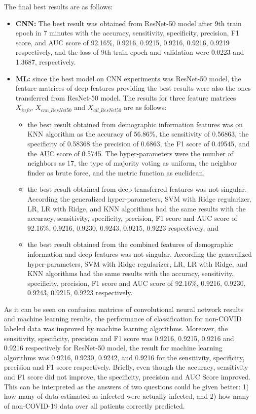 The final best results are as follows:
\begin{itemize}
	\item \textbf{CNN:} The best result was obtained from ResNet-50 model after 9th train epoch in 7 minutes with the accuracy, sensitivity, specificity, precision, F1 score, and AUC score of 92.16\%, 0.9216, 0.9215, 0.9216, 0.9216, 0.9219 respectively, and the loss of 9th train epoch and validation were 0.0223 and 1.3687, respectively.
	\item \textbf{ML:} since the best model on CNN experiments was ResNet-50 model, the feature matrices of deep features providing the best results were also the ones transferred from ResNet-50 model. The results for three feature matrices $X_{info}$, $X_{cnn\_ResNet50}$ and $X_{all\_ResNet50}$ are as follows:
	\begin{itemize}
		\item the best result obtained from demographic information features was on KNN algorithm as the accuracy of 56.86\%, the sensitivity of 0.56863, the specificity of 0.58368 the precision of 0.6863, the F1 score of 0.49545, and the AUC score of 0.5745. The hyper-parameters were the number of neighbors as 17, the type of majority voting as uniform, the neighbor finder as brute force, and the metric function as euclidean,
		\item the best result obtained from deep transferred features was not singular. According the generalized hyper-parameters, SVM with Ridge regularizer, LR, LR with Ridge, and KNN algorithms had the same results with the accuracy, sensitivity, specificity, precision, F1 score and AUC score of 92.16\%, 0.9216, 0.9230, 0.9243, 0.9215, 0.9223 respectively, and
		\item the best result obtained from the combined features of demographic information and deep features was not singular. According the generalized hyper-parameters, SVM with Ridge regularizer, LR, LR with Ridge, and KNN algorithms had the same results with the accuracy, sensitivity, specificity, precision, F1 score and AUC score of 92.16\%, 0.9216, 0.9230, 0.9243, 0.9215, 0.9223 respectively.
	\end{itemize}
\end{itemize}

As it can be seen on confusion matrices of convolutional neural network results and machine learning results, the performance of classification for non-COVID labeled data was improved by machine learning algorithms. Moreover, the sensitivity, specificity, precision and F1 score was 0.9216, 0.9215, 0.9216 and 0.9216 respectively for ResNet-50 model, the result for machine learning algorithms was 0.9216, 0.9230, 0.9242, and 0.9216 for the sensitivity, specificity, precision and F1 score respectively. Briefly, even though the accuracy, sensitivity and F1 score did not improve, the specificity, precision and AUC Score improved. This can be interpreted as the answers of two questions could be given better: 1) how many of data estimated as infected were actually infected, and 2) how many of non-COVID-19 data over all patients correctly predicted.


